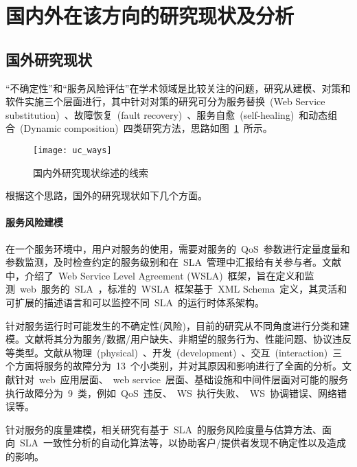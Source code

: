 \section{国内外在该方向的研究现状及分析}
\subsection{国外研究现状}

“不确定性”和“服务风险评估”在学术领域是比较关注的问题，研究从建模、对策和软件实施三个层面进行，其中针对对策的研究可分为服务替换~(Web Service substitution)~、故障恢复~(fault recovery)~、服务自愈~(self-healing)~和动态组合~(Dynamic composition)~四类研究方法，思路如图~\ref{uc_ways}~所示。

\begin{figure}[htbp]
\centering
\texttt{[image: uc\_ways]}
\caption{国内外研究现状综述的线索}\label{uc_ways}
\vspace{-1em}
\end{figure}

根据这个思路，国外的研究现状如下几个方面。

\setcounter{paragraph}{0}
\paragraph{服务风险建模}

在一个服务环境中，用户对服务的使用，需要对服务的~QoS~参数进行定量度量和参数监测，及时检查约定的服务级别和在~SLA~管理中汇报给有关参与者。文献\cite{keller2003wsla}中，介绍了~Web Service Level Agreement (WSLA)~框架，旨在定义和监测~web~服务的~SLA~，标准的~WSLA~框架基于~XML Schema~定义，其灵活和可扩展的描述语言和可以监控不同~SLA~的运行时体系架构。

针对服务运行时可能发生的不确定性(风险)，目前的研究从不同角度进行分类和建模。文献\cite{kokash2007evaluating}将其分为服务/数据/用户缺失、非期望的服务行为、性能问题、协议违反等类型。文献\cite{chan2009fault}从物理~(physical)~、开发~(development)~、交互~(interaction)~三个方面将服务的故障分为~13~个小类别，并对其原因和影响进行了全面的分析。文献针对~web~应用层面、~web service~层面、基础设施和中间件层面对可能的服务执行故障分为~9~类，例如~QoS~违反、~WS~执行失败、~WS~协调错误、网络错误等。

针对服务的度量建模，相关研究有基于~SLA~的服务风险度量与估算方法、面向~SLA~一致性分析的自动化算法等，以协助客户/提供者发现不确定性以及造成的影响。

